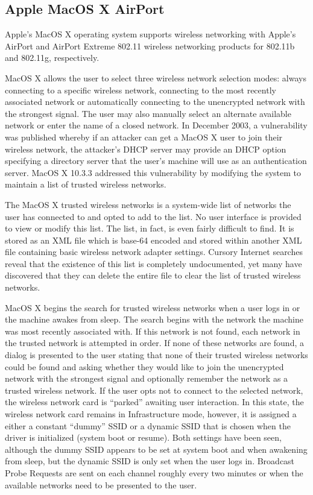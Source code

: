 \documentclass[10pt,twocolumn]{article}
\begin{document}
\subsection{Apple MacOS X AirPort}

Apple's MacOS X operating system supports wireless networking with
Apple's AirPort and AirPort Extreme 802.11 wireless networking
products for 802.11b and 802.11g, respectively.

MacOS X allows the user to select three wireless network selection
modes: always connecting to a specific wireless network, connecting to
the most recently associated network or automatically connecting to
the unencrypted network with the strongest signal.  The user may
also manually select an alternate available network or enter the name
of a closed network.  In December 2003, a vulnerability was published
whereby if an attacker can get a MacOS X user to join their wireless
network, the attacker's DHCP server may provide an DHCP option
specifying a directory server that the user's machine will use as an
authentication server.  MacOS X 10.3.3 addressed this vulnerability by
modifying the system to maintain a list of trusted wireless networks.

The MacOS X trusted wireless networks is a system-wide list of
networks the user has connected to and opted to add to the list.  No
user interface is provided to view or modify this list.  The list, in
fact, is even fairly difficult to find.  It is stored as an XML file
which is base-64 encoded and stored within another XML file containing
basic wireless network adapter settings.  Cursory Internet searches
reveal that the existence of this list is completely undocumented, yet
many have discovered that they can delete the entire file to clear the
list of trusted wireless networks.

MacOS X begins the search for trusted wireless networks when a user
logs in or the machine awakes from sleep.  The search begins with the
network the machine was most recently associated with.  If this
network is not found, each network in the trusted network is attempted
in order.  If none of these networks are found, a dialog is presented
to the user stating that none of their trusted wireless networks could
be found and asking whether they would like to join the unencrypted
network with the strongest signal and optionally remember the network
as a trusted wireless network.  If the user opts not to connect to the
selected network, the wireless network card is ``parked'' awaiting
user interaction.  In this state, the wireless network card remains in
Infrastructure mode, however, it is assigned a either a constant
``dummy'' SSID or a dynamic SSID that is chosen when the driver is
initialized (system boot or resume).  Both settings have been seen,
although the dummy SSID appears to be set at system boot and when
awakening from sleep, but the dynamic SSID is only set when the user
logs in.  Broadcast Probe Requests are sent on each channel roughly
every two minutes or when the available networks need to be presented
to the user.
\end{document}
